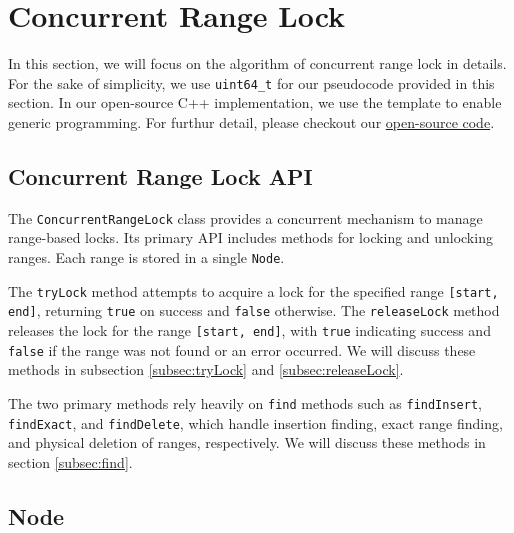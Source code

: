 \clearpage

\section{Concurrent Range Lock}\label{sec:concurrent-range-lock}

In this section, we will focus on the algorithm of concurrent range lock in details. For the sake of simplicity, we use \texttt{uint64\_t} for our pseudocode provided in this section. In our open-source C++ implementation, we use the template to enable generic
programming. For furthur detail, please checkout our \href{https://github.com/thuaduc/concurrent-range-locking}{ open-source code}.

\subsection{Concurrent Range Lock API}\label{subsec:api}

The \texttt{ConcurrentRangeLock} class provides a concurrent mechanism to manage range-based locks.
Its primary API includes methods for locking and unlocking ranges.
Each range is stored in a single \texttt{Node}.

The \texttt{tryLock} method attempts to acquire a lock for the specified range \texttt{[start, end]}, returning \texttt{true} on success and \texttt{false} otherwise.
The \texttt{releaseLock} method releases the lock for the range \texttt{[start, end]}, with \texttt{true} indicating success and \texttt{false} if the range was not found or an error occurred.
We will discuss these methods in subsection \ref{subsec:tryLock} and \ref{subsec:releaseLock}.

The two primary methods rely heavily on \texttt{find} methods such as \texttt{findInsert}, \texttt{findExact}, and \texttt{findDelete}, which handle insertion finding, exact range finding, and physical deletion of ranges, respectively. We will discuss these methods in section \ref{subsec:find}.

\begin{figure}[h]
    \centering
    
\end{figure}

\clearpage

\subsection{Node}\label{subsec:node}

